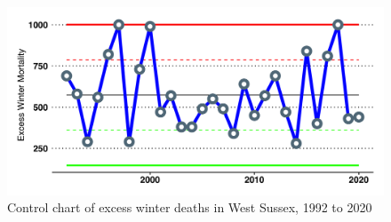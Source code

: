 \begin{figure}
    \caption{Control chart of excess winter deaths in West Sussex, 1992 to 2020}\label{fig:ewd_control_chart}
    \centering
    \includegraphics[width=\linewidth]{images/ewd_control_chart.png}
\end{figure}


